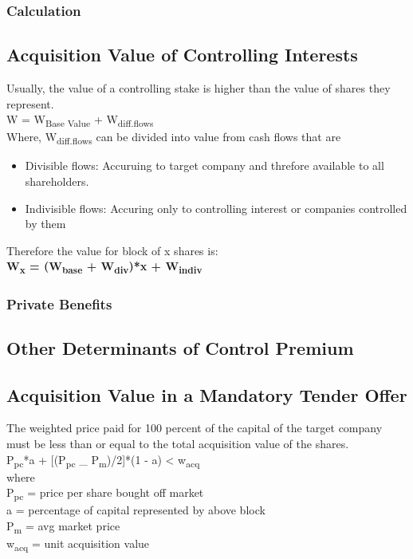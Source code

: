\documentclass[11pt]{article}
\begin{document}
\subsubsection*{Calculation}
\label{sec:org5081d1c}
\subsection*{Acquisition Value of Controlling Interests}
\label{sec:orge199f1a}
Usually, the value of a controlling stake is higher than the value of shares they represent.\\
W = W\textsubscript{Base Value} + W\textsubscript{diff.flows}\\
Where, W\textsubscript{diff.flows} can be divided into value from cash flows that are\\
\begin{itemize}
\item Divisible flows: Accuruing to target company and threfore available to all shareholders.\\
\item Indivisible flows: Accuring only to controlling interest or companies controlled by them\\
\end{itemize}
Therefore the value for block of x shares is:\\
\textbf{W\textsubscript{x} = (W\textsubscript{base} + W\textsubscript{div})*x + W\textsubscript{indiv}}\\
\subsubsection*{Private Benefits}
\label{sec:orgf35c380}
\subsection*{Other Determinants of Control Premium}
\label{sec:org148cf15}
\subsection*{Acquisition Value in a Mandatory Tender Offer}
\label{sec:orgedfc660}
The weighted price paid for 100 percent of the capital of the target company must be less than or equal to the total acquisition value of the shares.\\
P\textsubscript{pc}*a + [(P\textsubscript{pc} \_ P\textsubscript{m})/2]*(1 - a) < w\textsubscript{acq}\\
where\\
P\textsubscript{pc} = price per share bought off market\\
a = percentage of capital represented by above block\\
P\textsubscript{m} = avg market price\\
w\textsubscript{acq} = unit acquisition value\\
\end{document}
